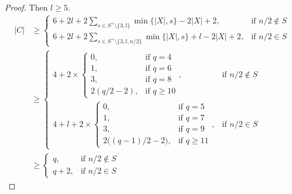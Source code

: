 \documentclass[10pt,a4paper]{amsart}
\begin{document}
\begin{proof}
Then $l \ge 5$.
\begin{align*}
|C| &\geq 
\begin{cases}
\displaystyle 6 + 2l+2\sum_{s\in S^+\setminus\{3,l\}} \min\{|X|,s\}-2|X|+2, & \text{if } n/2\notin S \\[4pt]
\displaystyle 6 +2l+ 2\sum_{s\in S^+\setminus\{3,l,n/2\}} \min\{|X|,s\}+ l-2|X|+2, & \text{if } n/2\in S
\end{cases} \\
&\geq 
\begin{cases}
\displaystyle 4 + 2\times
\begin{cases}
0, & \text{if } q=4 \\
1, & \text{if } q=6 \\
3, & \text{if } q=8 \\
2(q/2-2), & \text{if } q\ge 10
\end{cases}, & \text{if } n/2\notin S \\[4pt]
\displaystyle 4+ l + 2\times
\begin{cases}
0, & \text{if } q=5 \\
1, & \text{if } q=7 \\
3, & \text{if } q=9 \\
2\big((q-1)/2-2\big), & \text{if } q\ge 11
\end{cases}, & \text{if } n/2\in S
\end{cases} \\
&\geq 
\begin{cases}
\displaystyle q, & \text{if } n/2\notin S \\[4pt]
\displaystyle q+2, & \text{if } n/2\in S
\end{cases}
\end{align*}


\end{proof}
\end{document}
